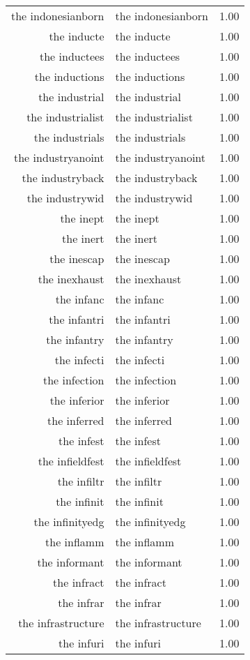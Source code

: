 \begin{table}[ht]
\begin{tabular}{rlr}
  the indonesianborn & the indonesianborn & 1.00 \\ 
  the inducte & the inducte & 1.00 \\ 
  the inductees & the inductees & 1.00 \\ 
  the inductions & the inductions & 1.00 \\ 
  the industrial & the industrial & 1.00 \\ 
  the industrialist & the industrialist & 1.00 \\ 
  the industrials & the industrials & 1.00 \\ 
  the industryanoint & the industryanoint & 1.00 \\ 
  the industryback & the industryback & 1.00 \\ 
  the industrywid & the industrywid & 1.00 \\ 
  the inept & the inept & 1.00 \\ 
  the inert & the inert & 1.00 \\ 
  the inescap & the inescap & 1.00 \\ 
  the inexhaust & the inexhaust & 1.00 \\ 
  the infanc & the infanc & 1.00 \\ 
  the infantri & the infantri & 1.00 \\ 
  the infantry & the infantry & 1.00 \\ 
  the infecti & the infecti & 1.00 \\ 
  the infection & the infection & 1.00 \\ 
  the inferior & the inferior & 1.00 \\ 
  the inferred & the inferred & 1.00 \\ 
  the infest & the infest & 1.00 \\ 
  the infieldfest & the infieldfest & 1.00 \\ 
  the infiltr & the infiltr & 1.00 \\ 
  the infinit & the infinit & 1.00 \\ 
  the infinityedg & the infinityedg & 1.00 \\ 
  the inflamm & the inflamm & 1.00 \\ 
  the informant & the informant & 1.00 \\ 
  the infract & the infract & 1.00 \\ 
  the infrar & the infrar & 1.00 \\ 
  the infrastructure & the infrastructure & 1.00 \\ 
  the infuri & the infuri & 1.00 \\ 

\end{tabular}
\end{table}
